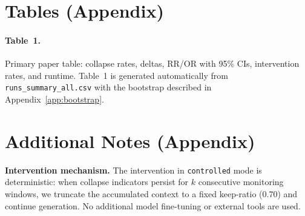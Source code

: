 \documentclass{article}
\begin{document}
\section{Tables (Appendix)}\label{app:tables}
\paragraph{Table~1.} Primary paper table: collapse rates, deltas, RR/OR with 95\% CIs, intervention rates, and runtime. Table~1 is generated automatically from \texttt{runs\_summary\_all.csv} with the bootstrap described in Appendix~\ref{app:bootstrap}.

\section{Additional Notes (Appendix)}\label{app:notes}
\textbf{Intervention mechanism.} The intervention in \texttt{controlled} mode is deterministic: when collapse indicators persist for \(k\) consecutive monitoring windows, we truncate the accumulated context to a fixed keep-ratio (0.70) and continue generation. No additional model fine-tuning or external tools are used.
\end{document}
